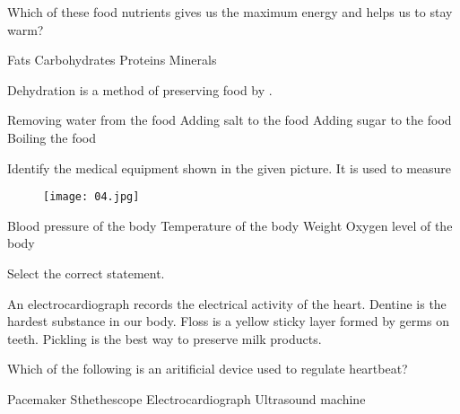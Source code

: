 \begin{questions}
    \question Which of these food nutrients gives us the maximum energy and helps us to stay warm?

    \begin{randomizeoneparchoices}
        \CorrectChoice Fats
        \choice Carbohydrates
        \choice Proteins
        \choice Minerals
    \end{randomizeoneparchoices}

    \question Dehydration is a method of preserving food by \fillin .

    \begin{randomizeoneparchoices}
        \CorrectChoice Removing water from the food
        \choice Adding salt to the food
        \choice Adding sugar to the food
        \choice Boiling the food
    \end{randomizeoneparchoices}

    \question Identify the medical equipment shown in the given picture. It is used to measure \\
    
    \begin{figure}[h!]
        \centering
        \texttt{[image: 04.jpg]}
      \end{figure}
    
    \begin{randomizechoices}
        \CorrectChoice Blood pressure of the body %
        \choice Temperature of the body
        \choice Weight
        \choice Oxygen level of the body
    \end{randomizechoices}

    \question Select the correct statement.

    \begin{randomizechoices}
        \CorrectChoice An electrocardiograph records the electrical activity of the heart.
        \choice Dentine is the hardest substance in our body.
        \choice Floss is a yellow sticky layer formed by germs on teeth.
        \choice Pickling is the best way to preserve milk products.
    \end{randomizechoices}
    
    \question Which of the following is an aritificial device used to regulate heartbeat?

    \begin{randomizeoneparchoices}
        \CorrectChoice Pacemaker
        \choice Sthethescope
        \choice Electrocardiograph
        \choice Ultrasound machine
    \end{randomizeoneparchoices}


\end{questions}
